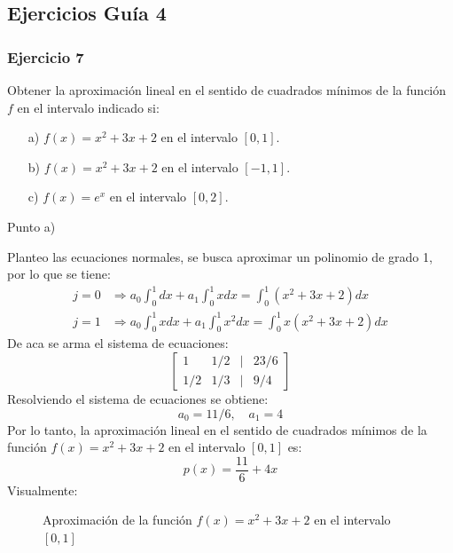 \documentclass{article}
\begin{document}
\subsection{Ejercicios Guía 4}
\subsubsection{Ejercicio 7}
Obtener la aproximación lineal en el sentido de cuadrados mínimos de la función $f$ en el intervalo indicado si:
\begin{itemize}
    \item[a) ] $f(x) = x^2 + 3x + 2$ en el intervalo $[0,1]$.
    \item[b) ] $f(x) = x^2 + 3x + 2$ en el intervalo $[-1,1]$.
    \item[c) ] $f(x) = e^x$ en el intervalo $[0,2]$.   
\end{itemize}

\begin{center}
    Punto a) \\
\end{center}

Planteo las ecuaciones normales, se busca aproximar un polinomio de grado 1, por lo que se tiene:
\begin{align}
    j = 0 &\Rightarrow a_0 \int_{0}^{1} dx + a_1 \int_{0}^{1} x dx = \int_{0}^{1} (x^2 + 3x + 2) dx \\
    j = 1 &\Rightarrow a_0 \int_{0}^{1} x dx + a_1 \int_{0}^{1} x^2 dx = \int_{0}^{1} x(x^2 + 3x + 2) dx
\end{align}
De aca se arma el sistema de ecuaciones:
\begin{equation}
    \begin{bmatrix}
        1 & 1/2 & | & 23/6 \\
        1/2 & 1/3 & | & 9/4
    \end{bmatrix}
\end{equation}
Resolviendo el sistema de ecuaciones se obtiene:
\begin{equation}
    a_0 = 11/6, \quad a_1 = 4
\end{equation}
Por lo tanto, la aproximación lineal en el sentido de cuadrados mínimos de la función \( f(x) = x^2 + 3x + 2 \) en el intervalo \([0,1]\) es:
\begin{equation}
    p(x) = \frac{11}{6} + 4x
\end{equation}
\newpage
Visualmente:
\begin{figure}[h]
    \centering
    \caption{Aproximación de la función \( f(x) = x^2 + 3x + 2 \) en el intervalo \([0,1]\)}
    \label{fig:myplot9}
\end{figure}
\end{document}
